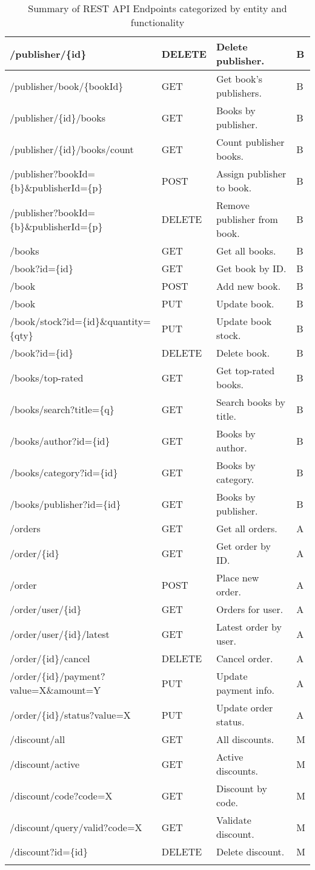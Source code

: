 \begin{longtable}{|p{}|p{} |p{}|p{}|}
\hline
/publisher/\{id\} & DELETE & Delete publisher. & B \\
\hline
/publisher/book/\{bookId\} & GET & Get book’s publishers. & B \\
\hline
/publisher/\{id\}/books & GET & Books by publisher. & B \\
\hline
/publisher/\{id\}/books/count & GET & Count publisher books. & B \\
\hline
/publisher?bookId=\{b\}\&publisherId=\{p\} & POST & Assign publisher to book. & B \\
\hline
/publisher?bookId=\{b\}\&publisherId=\{p\} & DELETE & Remove publisher from book. & B \\
\hline
/books & GET & Get all books. & B \\
\hline
/book?id=\{id\} & GET & Get book by ID. & B \\
\hline
/book & POST & Add new book. & B \\
\hline
/book & PUT & Update book. & B \\
\hline
/book/stock?id=\{id\}\&quantity=\{qty\} & PUT & Update book stock. & B \\
\hline
/book?id=\{id\} & DELETE & Delete book. & B \\
\hline
/books/top-rated & GET & Get top-rated books. & B \\
\hline
/books/search?title=\{q\} & GET & Search books by title. & B \\
\hline
/books/author?id=\{id\} & GET & Books by author. & B \\
\hline
/books/category?id=\{id\} & GET & Books by category. & B \\
\hline
/books/publisher?id=\{id\} & GET & Books by publisher. & B \\
\hline
/orders & GET & Get all orders. & A \\
\hline
/order/\{id\} & GET & Get order by ID. & A \\
\hline
/order & POST & Place new order. & A \\
\hline
/order/user/\{id\} & GET & Orders for user. & A \\
\hline
/order/user/\{id\}/latest & GET & Latest order by user. & A \\
\hline
/order/\{id\}/cancel & DELETE & Cancel order. & A \\
\hline
/order/\{id\}/payment?value=X\&amount=Y & PUT & Update payment info. & A \\
\hline
/order/\{id\}/status?value=X & PUT & Update order status. & A \\
\hline
/discount/all & GET & All discounts. & M \\
\hline
/discount/active & GET & Active discounts. & M \\
\hline
/discount/code?code=X & GET & Discount by code. & M \\
\hline
/discount/query/valid?code=X & GET & Validate discount. & M \\
\hline
/discount?id=\{id\} & DELETE & Delete discount. & M \\
\hline

\caption{Summary of REST API Endpoints categorized by entity and functionality}
\label{tab:apiSummary}
\end{longtable}
